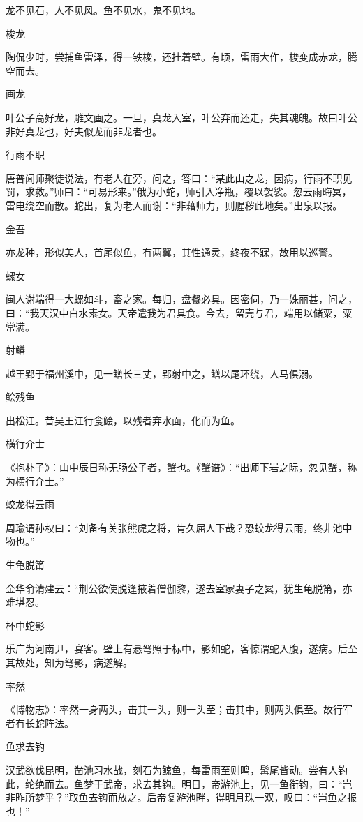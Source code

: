 \documentclass[a4paper,12pt,UTF8,twoside]{ctexbook}
\begin{document}
    龙不见石，人不见风。鱼不见水，鬼不见地。
    
    梭龙
    
    陶侃少时，尝捕鱼雷泽，得一铁梭，还挂着壁。有顷，雷雨大作，梭变成赤龙，腾空而去。
    
    画龙
    
    叶公子高好龙，雕文画之。一旦，真龙入室，叶公弃而还走，失其魂魄。故曰叶公非好真龙也，好夫似龙而非龙者也。
    
    行雨不职
    
    唐普闻师聚徒说法，有老人在旁，问之，答曰：“某此山之龙，因病，行雨不职见罚，求救。”师曰：“可易形来。”俄为小蛇，师引入净瓶，覆以袈裟。忽云雨晦冥，雷电绕空而散。蛇出，复为老人而谢：“非藉师力，则腥秽此地矣。”出泉以报。
    
    金吾
    
    亦龙种，形似美人，首尾似鱼，有两翼，其性通灵，终夜不寐，故用以巡警。
    
    螺女
    
    闽人谢端得一大螺如斗，畜之家。每归，盘餐必具。因密伺，乃一姝丽甚，问之，曰：“我天汉中白水素女。天帝遣我为君具食。今去，留壳与君，端用以储粟，粟常满。
    
    射鳝
    
    越王郢于福州溪中，见一鳝长三丈，郢射中之，鳝以尾环绕，人马俱溺。
    
    鲙残鱼
    
    出松江。昔吴王江行食鲙，以残者弃水面，化而为鱼。
    
    横行介士
    
    《抱朴子》：山中辰日称无肠公子者，蟹也。《蟹谱》：“出师下岩之际，忽见蟹，称为横行介士。”
    
    蛟龙得云雨
    
    周瑜谓孙权曰：“刘备有关张熊虎之将，肯久屈人下哉？恐蛟龙得云雨，终非池中物也。”
    
    生龟脱筩
    
    金华俞清建云：“荆公欲使脱逢掖着僧伽黎，遂去室家妻子之累，犹生龟脱筩，亦难堪忍。
    
    杯中蛇影
    
    乐广为河南尹，宴客。壁上有悬弩照于标中，影如蛇，客惊谓蛇入腹，遂病。后至其故处，知为弩影，病遂解。
    
    率然
    
    《博物志》：率然一身两头，击其一头，则一头至；击其中，则两头俱至。故行军者有长蛇阵法。
    
    鱼求去钓
    
    汉武欲伐昆明，凿池习水战，刻石为鲸鱼，每雷雨至则鸣，髯尾皆动。尝有人钓此，纶绝而去。鱼梦于武帝，求去其钩。明日，帝游池上，见一鱼衔钩，曰：“岂非昨所梦乎？”取鱼去钩而放之。后帝复游池畔，得明月珠一双，叹曰：“岂鱼之报也！”
    
\end{document}
